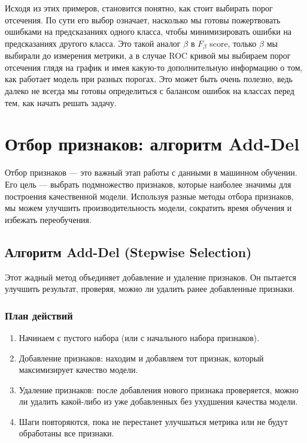 Исходя из этих примеров, становится понятно, как стоит выбирать порог отсечения. По сути его выбор означает, насколько мы готовы пожертвовать ошибками на предсказаниях одного класса, чтобы минимизировать ошибки на предсказаниях другого класса.
Это такой аналог $\beta$ в $F_{\beta}$ score, только $\beta$ мы выбирали до измерения метрики, а в случае ROC кривой мы выбираем порог отсечения глядя на график и имея какую-то дополнительную информацию о том, как работает модель при разных порогах.
Это может быть очень полезно, ведь далеко не всегда мы готовы определиться с балансом ошибок на классах перед тем, как начать решать задачу.


\section*{Отбор признаков: алгоритм Add-Del}

Отбор признаков — это важный этап работы с данными в машинном обучении. Его цель — выбрать подмножество признаков, которые наиболее значимы для построения качественной модели. Используя разные методы отбора признаков, мы можем улучшить производительность модели, сократить время обучения и избежать переобучения. 




\subsection*{Алгоритм Add-Del (Stepwise Selection)}

Этот жадный метод объединяет добавление и удаление признаков. Он пытается улучшить результат, проверяя, можно ли удалить ранее добавленные признаки.

\subsubsection*{План действий}

\begin{enumerate}

\item Начинаем с пустого набора (или с начального набора признаков).

\item Добавление признаков: находим и добавляем тот признак, который максимизирует качество модели.

\item Удаление признаков: после добавления нового признака проверяется, можно ли удалить какой-либо из уже добавленных без ухудшения качества модели.

\item Шаги повторяются, пока не перестанет улучшаться метрика или не будут обработаны все признаки.

\end{enumerate}


